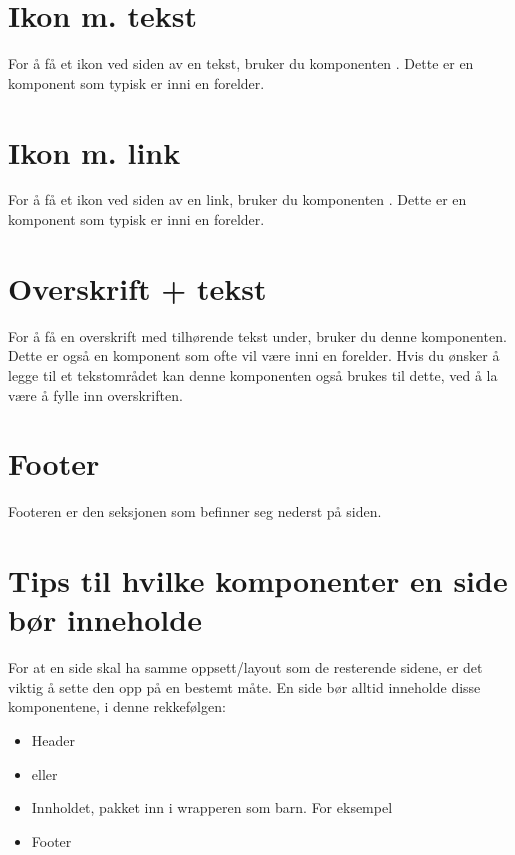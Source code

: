 \section{Ikon m. tekst}
For å få et ikon ved siden av en tekst, bruker du komponenten . Dette er en komponent som typisk er inni en forelder.

\section{Ikon m. link}
For å få et ikon ved siden av en link, bruker du komponenten . Dette er en komponent som typisk er inni en forelder.

\section{Overskrift + tekst}
For å få en overskrift med tilhørende tekst under, bruker du denne komponenten. Dette er også en komponent som ofte vil være inni en forelder. Hvis du ønsker å legge til et tekstområdet kan denne komponenten også brukes til dette, ved å la være å fylle inn overskriften. 

\section{Footer}
Footeren er den seksjonen som befinner seg nederst på siden. 

\begin{figure}[H]
    \centering
    \label{fig:cms-footer}
\end{figure}

\section{Tips til hvilke komponenter en side bør inneholde}
For at en side skal ha samme oppsett/layout som de resterende sidene, er det viktig å sette den opp på en bestemt måte. En side bør alltid inneholde disse komponentene, i denne rekkefølgen:
\begin{itemize}
\item Header
\item {} eller 
\item Innholdet, pakket inn i wrapperen som barn. For eksempel 
\item Footer
\end{itemize}

